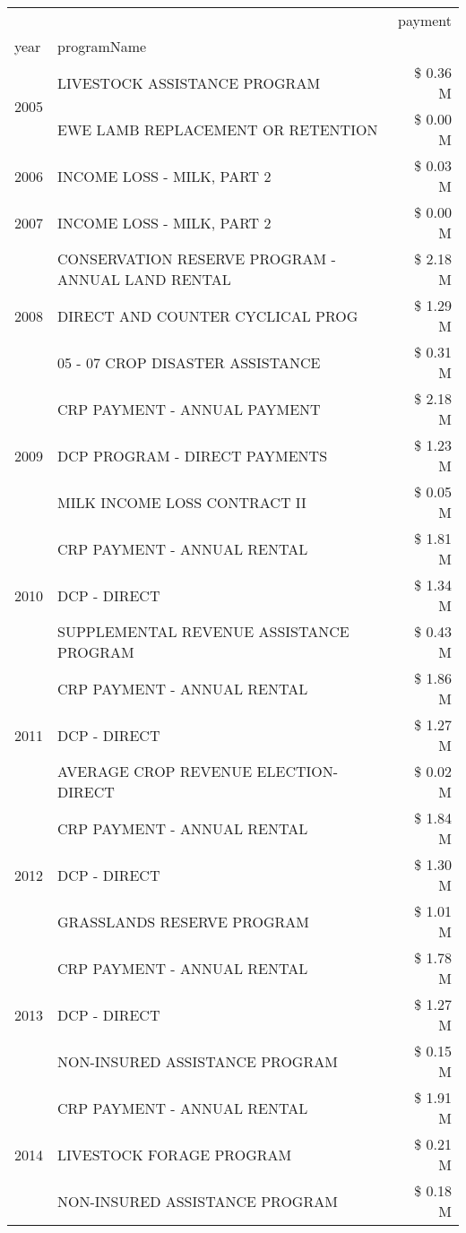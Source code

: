 \begin{tabular}{llr}
\toprule
 &  & payment \\
year & programName &  \\
\midrule
\multirow[t]{2}{*}{2005} & LIVESTOCK ASSISTANCE PROGRAM & \$ 0.36 M \\
 & EWE LAMB REPLACEMENT OR RETENTION & \$ 0.00 M \\
\cline{1-3}
2006 & INCOME LOSS - MILK, PART 2 & \$ 0.03 M \\
\cline{1-3}
2007 & INCOME LOSS - MILK, PART 2 & \$ 0.00 M \\
\cline{1-3}
\multirow[t]{3}{*}{2008} & CONSERVATION RESERVE PROGRAM - ANNUAL LAND RENTAL & \$ 2.18 M \\
 & DIRECT AND COUNTER CYCLICAL PROG & \$ 1.29 M \\
 & 05 - 07 CROP DISASTER ASSISTANCE & \$ 0.31 M \\
\cline{1-3}
\multirow[t]{3}{*}{2009} & CRP PAYMENT - ANNUAL PAYMENT & \$ 2.18 M \\
 & DCP PROGRAM - DIRECT PAYMENTS & \$ 1.23 M \\
 & MILK INCOME LOSS CONTRACT II & \$ 0.05 M \\
\cline{1-3}
\multirow[t]{3}{*}{2010} & CRP PAYMENT - ANNUAL RENTAL & \$ 1.81 M \\
 & DCP - DIRECT & \$ 1.34 M \\
 & SUPPLEMENTAL REVENUE ASSISTANCE PROGRAM & \$ 0.43 M \\
\cline{1-3}
\multirow[t]{3}{*}{2011} & CRP PAYMENT - ANNUAL RENTAL & \$ 1.86 M \\
 & DCP - DIRECT & \$ 1.27 M \\
 & AVERAGE CROP REVENUE ELECTION-DIRECT & \$ 0.02 M \\
\cline{1-3}
\multirow[t]{3}{*}{2012} & CRP PAYMENT - ANNUAL RENTAL & \$ 1.84 M \\
 & DCP - DIRECT & \$ 1.30 M \\
 & GRASSLANDS RESERVE PROGRAM & \$ 1.01 M \\
\cline{1-3}
\multirow[t]{3}{*}{2013} & CRP PAYMENT - ANNUAL RENTAL & \$ 1.78 M \\
 & DCP - DIRECT & \$ 1.27 M \\
 & NON-INSURED ASSISTANCE PROGRAM & \$ 0.15 M \\
\cline{1-3}
\multirow[t]{3}{*}{2014} & CRP PAYMENT - ANNUAL RENTAL & \$ 1.91 M \\
 & LIVESTOCK FORAGE PROGRAM & \$ 0.21 M \\
 & NON-INSURED ASSISTANCE PROGRAM & \$ 0.18 M \\

\end{tabular}
